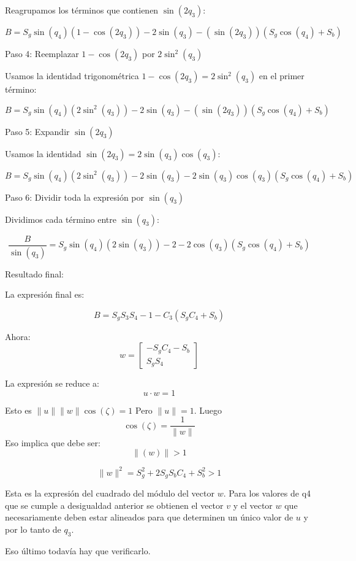 \documentclass[a4paper,12pt]{article}
\begin{document}
Reagrupamos los términos que contienen \( \sin(2q_3) \):

\[
B = S_g \sin(q_4)(1 - \cos(2q_3)) - 2\sin(q_3) - (\sin(2q_3))(S_g \cos(q_4) + S_b)
\]

 Paso 4: Reemplazar \( 1 - \cos(2q_3) \) por \( 2\sin^2(q_3) \)

Usamos la identidad trigonométrica \( 1 - \cos(2q_3) = 2\sin^2(q_3) \) en el primer término:

\[
B = S_g \sin(q_4)(2\sin^2(q_3)) - 2\sin(q_3) - (\sin(2q_3))(S_g \cos(q_4) + S_b)
\]

 Paso 5: Expandir \( \sin(2q_3) \)

Usamos la identidad \( \sin(2q_3) = 2\sin(q_3)\cos(q_3) \):

\[
B = S_g \sin(q_4)(2\sin^2(q_3)) - 2\sin(q_3) - 2\sin(q_3)\cos(q_3)(S_g \cos(q_4) + S_b)
\]

 Paso 6: Dividir toda la expresión por \( \sin(q_3) \)

Dividimos cada término entre \( \sin(q_3) \):

\[
\frac{B}{\sin(q_3)} = S_g \sin(q_4)(2\sin(q_3)) - 2 - 2\cos(q_3)(S_g \cos(q_4) + S_b)
\]

 Resultado final:

La expresión final es:

\[
B= S_g S_3S_4 - 1 - C_3(S_g C_4 + S_b)
\]

Ahora: 
\begin{equation}
    w =
    \begin{bmatrix}
        -S_gC_4 - S_b\\
        S_gS_4
    \end{bmatrix}
\end{equation}

La expresión se reduce a:
\[u \cdot w = 1\]

Esto es $\parallel u \parallel \parallel w \parallel \cos(\zeta) = 1$
Pero $\parallel u \parallel  = 1$. Luego
\[
    \cos(\zeta) = \frac{1}{\parallel w \parallel}
\]
Eso implica que debe ser:
\[
    \parallel(w) \parallel > 1
\]

\[
\|w\|^2 = S_g^2 + 2S_g S_b C_4 + S_b^2 > 1
\]

Esta es la expresión del cuadrado del módulo del vector \( w \).
Para los valores de q4 que se cumple a desigualdad anterior se obtienen
el vector $v$ y el vector $w$ que necesariamente deben estar alineados para que
determinen un único valor de $u$ y por lo tanto de $q_3$.

Eso último todavía hay que verificarlo.
\end{document}
